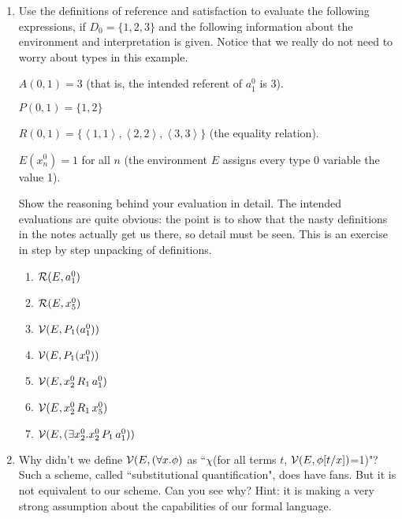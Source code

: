 \documentclass[12pt]{book}
\begin{document}
\begin{enumerate}
\item Use the definitions of reference and satisfaction to evaluate the
following expressions, if $D_0 = \{1,2,3\}$ and the following
information about the environment and interpretation is given.  Notice
that we really do not need to worry about types in this example.

$A(0,1)=3$ (that is, the intended referent of $a^0_1$ is 3).

$P(0,1) = \{1,2\}$

$R(0,1) = \{\left<1,1\right>,\left<2,2\right>,\left<3,3\right>\}$ (the
equality relation).

$E(x^0_n)= 1$ for all $n$ (the environment $E$ assigns every type 0
variable the value 1).

Show the reasoning behind your evaluation in detail.  The intended
evaluations are quite obvious: the point is to show that the nasty
definitions in the notes actually get us there, so detail must be
seen.  This is an exercise in step by step unpacking of definitions.

\begin{enumerate}

\item ${\cal R}(E,a^0_1)$

\item ${\cal R}(E,x^0_5)$

\item ${\cal V}(E,P_1(a^0_1))$

\item ${\cal V}(E,P_1(x^0_1))$

\item ${\cal V}(E,x^0_2\,R_1\,a^0_1)$

\item ${\cal V}(E,x^0_2\,R_1\,x^0_5)$

\item ${\cal V}(E,(\exists x^0_2.x^0_2\,P_1\,a^0_1))$

\end{enumerate}

\item  Why didn't we define ${\cal V}(E,(\forall x.\phi)$ as ``$\chi$(for all terms $t$, ${\cal V}(E,\phi[t/x])$=1)"?  Such a scheme,
called ``substitutional quantification", does have fans.  But it is not equivalent to our scheme.  
Can you see why?  Hint:  it is making a very strong assumption about the capabilities of our formal language.


\end{enumerate}
\end{document}
